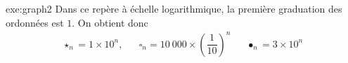 \begin{multicols}{2}
{\begin{center}
	\end{center}

}{exe:graph2}{
	Dans ce repère à échelle logarithmique, la première graduation des ordonnées est $1$.
	On obtient donc
		\begin{align*}
			\star_n = 1 \times 10^n, && \square_n = 10~000\times \left(\dfrac1{10}\right)^n && \bullet_n = 3 \times 10^n
		\end{align*} 
}

\end{multicols}


%
%
